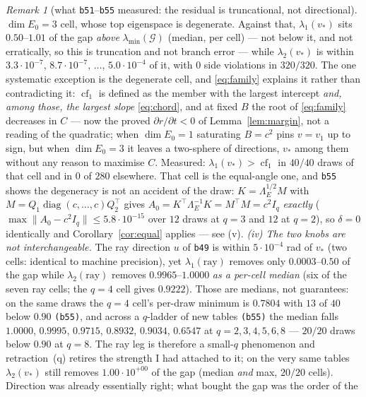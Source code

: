 \documentclass[11pt]{article}
\theoremstyle{remark}
\newtheorem{remark}{Remark}[section]
\newcommand{\Gr}{\mathcal{G}}
\newcommand{\Le}{\Lambda_E}
\begin{document}
\begin{remark}[what \texttt{b51}--\texttt{b55} measured: the residual is truncational, not directional]
$\operatorname{dim}E_0=3$ cell, whose top eigenspace is degenerate. Against that,
$\lambda_1(v_\ast)$ sits $0.50$--$1.01$ of the gap \emph{above}
$\lambda_{\min}(\Gr)$ (median, per cell) --- not below it, and not erratically, so this is truncation
and not branch error --- while $\lambda_2(v_\ast)$ is within $3.3\cdot10^{-7}$, $8.7\cdot10^{-7}$,
$\ldots$, $5.0\cdot10^{-4}$ of it, with $0$ side violations in $320/320$.
The one systematic exception is the degenerate cell, and \eqref{eq:family} explains it rather than
contradicting it: $\operatorname{cf}_1$ is defined as the member with the largest intercept \emph{and,
among those, the largest slope} \eqref{eq:chord}, and at fixed $B$ the root of \eqref{eq:family}
decreases in $C$ --- now the proved $\partial r/\partial t<0$ of Lemma~\ref{lem:margin}, not a reading
of the quadratic; when $\operatorname{dim}E_0=1$ saturating $B=c^{2}$ pins $v=v_1$ up to sign, but when
$\operatorname{dim}E_0=3$ it leaves a two-sphere of directions, $v_\ast$ among them without any reason
to maximise $C$. Measured: $\lambda_1(v_\ast)>\operatorname{cf}_1$ in $40/40$ draws of that cell and in
$0$ of $280$ elsewhere. That cell is the equal-angle one, and \texttt{b55} shows the degeneracy is not
an accident of the draw: $K=\Le^{1/2}M$ with $M=Q_1\operatorname{diag}(c,\ldots,c)Q_2^{\top}$ gives
$A_0=K^{\top}\Le^{-1}K=M^{\top}M=c^{2}I_q$ \emph{exactly} ($\max\|A_0-c^{2}I_q\|\le5.8\cdot10^{-15}$
over $12$ draws at $q=3$ and $12$ at $q=2$), so $\delta=0$ identically and Corollary~\ref{cor:equal}
applies --- see (v).
\emph{(iv) The two knobs are not interchangeable.} The ray direction $u$ of \texttt{b49} is within
$5\cdot10^{-4}$ rad of $v_\ast$ (two cells: identical to machine precision), yet
$\lambda_1(\text{ray})$ removes only $0.0003$--$0.50$ of the gap while $\lambda_2(\text{ray})$ removes
$0.9965$--$1.0000$ \emph{as a per-cell median} (six of the seven ray cells; the $q=4$ cell gives
$0.9222$). Those are medians, not guarantees: on the same draws the $q=4$ cell's per-draw minimum is
$0.7804$ with $13$ of $40$ below $0.90$ \texttt{(b55)}, and across a $q$-ladder of new tables
\texttt{(b55)} the median falls $1.0000$, $0.9995$, $0.9715$, $0.8932$, $0.9034$, $0.6547$ at
$q=2,3,4,5,6,8$ --- $20/20$ draws below $0.90$ at $q=8$. The ray leg is therefore a small-$q$
phenomenon and retraction~(q) retires the strength I had attached to it; on the very same tables
$\lambda_2(v_\ast)$ still removes $1.00\cdot10^{+00}$ of the gap (median \emph{and} max, $20/20$ cells).
Direction was already essentially right; what bought the gap was the order of the

\end{remark}
\end{document}
